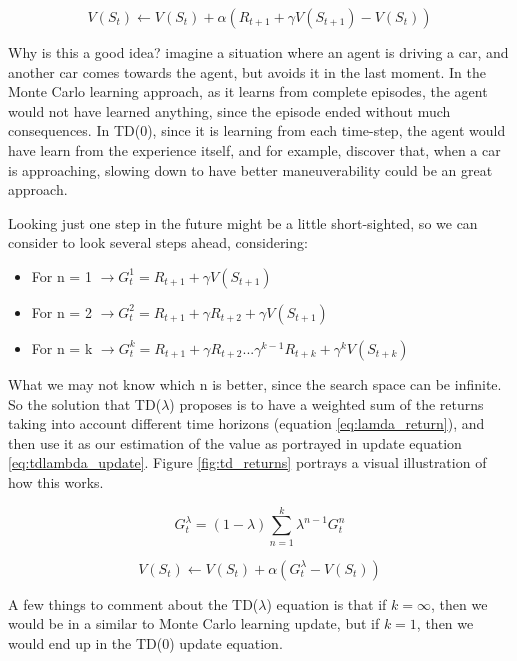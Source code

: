 \begin{equation} \label{eq:eq_td0_update}
	V(S_t) \leftarrow V(S_t) + \alpha(R_{t+1} + \gamma V(S_{t+1}) - V(S_t))
\end{equation}

Why is this a good idea? imagine a situation where an agent is driving a car, and another car comes towards the agent, but avoids it in the last moment. In the Monte Carlo learning approach, as it learns from complete episodes, the agent would not have learned anything, since the episode ended without much consequences. In TD(0), since it is learning from each time-step, the agent would have learn from the experience itself, and for example, discover that, when a car is approaching, slowing down to have better maneuverability could be an great approach.

Looking just one step in the future might be a little short-sighted, so we can consider to look several steps ahead, considering:

\begin{itemize}
	\item For n = 1 $\rightarrow G^{1}_t = R_{t+1} + \gamma V(S_{t+1})$
	\item For n = 2 $\rightarrow G^{2}_t = R_{t+1} + \gamma R_{t+2} + \gamma V(S_{t+1})$
	\item For n = k $\rightarrow G^{k}_t = R_{t+1} + \gamma R_{t+2} ... \gamma^{k-1}R_{t+k} + \gamma^{k} V(S_{t+k})$
\end{itemize}

What we may not know which n is better, since the search space can be infinite. So the solution that TD($\lambda$) proposes is to have a weighted sum of the returns taking into account different time horizons (equation \ref{eq:lamda_return}), and then use it as our estimation of the value as portrayed in update equation \ref{eq:tdlambda_update}. Figure \ref{fig:td_returns} portrays a visual illustration of how this works.

\begin{equation}\label{eq:lamda_return}
	G^{\lambda}_{t} = (1-\lambda)\sum_{n=1}^{k} \lambda^{n-1}G^{n}_{t}
\end{equation}

\begin{equation} \label{eq:tdlambda_update}
	V(S_t) \leftarrow V(S_t) + \alpha(G^{\lambda}_{t} - V(S_t))
\end{equation}

A few things to comment about the TD($\lambda$) equation is that if $k=\infty$, then we would be in a similar to Monte Carlo learning update, but if $k=1$, then we would end up in the TD(0) update equation.

